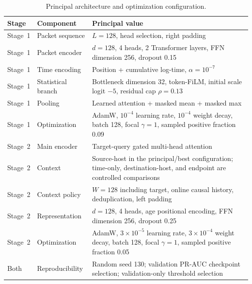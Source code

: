 \documentclass[11pt,fleqn]{report}
\begin{document}
\begin{table}[H]
    \centering
    \caption{Principal architecture and optimization configuration.}
    \label{tab:principal_method_config}
    \small
    \begin{tabular}{@{}p{2.0cm}p{4.4cm}p{7.6cm}@{}}
        \toprule
        Stage & Component & Principal value \\
        \midrule
        Stage~1 & Packet sequence & $L=128$, head selection, right padding \\
        Stage~1 & Packet encoder & $d=128$, 4 heads, 2 Transformer layers,
        FFN dimension 256, dropout 0.15 \\
        Stage~1 & Time encoding & Position + cumulative log-time,
        $\alpha=10^{-7}$ \\
        Stage~1 & Statistical branch & Bottleneck dimension 32, token-FiLM,
        initial scale logit $-5$, residual cap $\rho=0.13$ \\
        Stage~1 & Pooling & Learned attention + masked mean + masked max \\
        Stage~1 & Optimization & AdamW, $10^{-4}$ learning rate,
        $10^{-4}$ weight decay, batch 128, focal $\gamma=1$,
        sampled positive fraction 0.09 \\
        \midrule
        Stage~2 & Main encoder & Target-query gated multi-head attention \\
        Stage~2 & Context & Source-host in the principal/best configuration;
        time-only, destination-host, and endpoint are controlled comparisons \\
        Stage~2 & Context policy & $W=128$ including target, online causal
        history, deduplication, left padding \\
        Stage~2 & Representation & $d=128$, 4 heads, age positional encoding,
        FFN dimension 256, dropout 0.25 \\
        Stage~2 & Optimization & AdamW, $3\times10^{-5}$ learning rate,
        $3\times10^{-4}$ weight decay, batch 128, focal $\gamma=1$,
        sampled positive fraction 0.05 \\
        Both & Reproducibility & Random seed 130; validation PR-AUC checkpoint
        selection; validation-only threshold selection \\
        \bottomrule
    \end{tabular}
\end{table}

\end{document}
